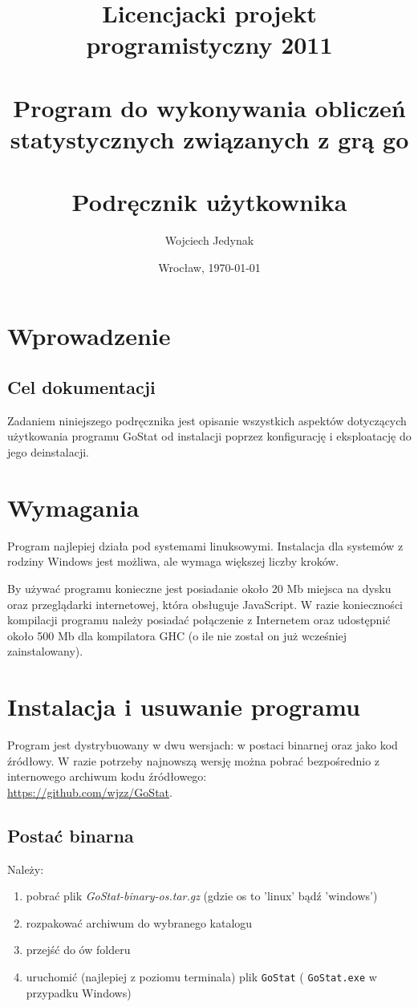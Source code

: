 \documentclass[10pt,leqno]{article}
\title{\LARGE Licencjacki projekt programistyczny 2011 \\ 
       \ \\
       Program do wykonywania obliczeń statystycznych związanych z grą go \\ 
       \ \\
       Podręcznik użytkownika }
\author{Wojciech Jedynak}
\date{Wrocław, \today}
\newcommand{\cmd}[1]{
  \texttt{#1}
}
\begin{document}
\maketitle 

\newpage

\tableofcontents

\newpage

\section{Wprowadzenie}

\subsection{Cel dokumentacji}
Zadaniem niniejszego podręcznika jest opisanie wszystkich aspektów dotyczących użytkowania programu GoStat od instalacji poprzez konfigurację
i eksploatację do jego deinstalacji.

\section{Wymagania}
Program najlepiej działa pod systemami linuksowymi. Instalacja dla systemów z rodziny Windows jest możliwa, ale wymaga większej liczby kroków. 

By używać programu konieczne jest posiadanie około 20 Mb miejsca na dysku oraz przeglądarki internetowej, która obsługuje JavaScript. 
W razie konieczności kompilacji programu należy posiadać połączenie z Internetem oraz udostępnić około 500 Mb dla kompilatora GHC (o ile nie 
został on już wcześniej zainstalowany).

\newpage

\section{Instalacja i usuwanie programu}
Program jest dystrybuowany w dwu wersjach: w postaci binarnej oraz jako kod źródłowy. W razie potrzeby najnowszą wersję można 
pobrać bezpośrednio z internowego archiwum kodu źródłowego: \\ 
\url{https://github.com/wjzz/GoStat}.

\subsection{Postać binarna}
Należy: 
\begin{enumerate}
\item pobrać plik \emph{GoStat-binary-os.tar.gz} (gdzie os to 'linux' bądź 'windows')
\item rozpakować archiwum do wybranego katalogu
\item przejść do ów folderu
\item uruchomić (najlepiej z poziomu terminala) plik \cmd{GoStat} (\cmd{GoStat.exe} w przypadku Windows)
\end{enumerate}
\end{document}
